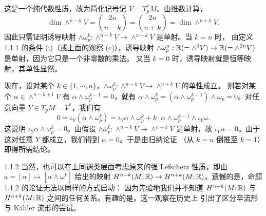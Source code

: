 \begin{wproof}
这是一个纯代数性质，故为简化记号记 $V=T_p^*M$。由维数计算，
\[
  \dim\wedge^{n-k}V=\binom{2n}{n-k}=\binom{2n}{n+k}=\dim\wedge^{n+k}V .
\]
因此只需证明诱导映射 $\wedge\omega_p^k:\wedge^{n-k}V\to\wedge^{n+k}V$ 是单射。当 $k=n$ 时，
由定义 1.1.1 的条件 (i)（或上面的观察 (c)），诱导映射
$\wedge\omega_p^n:\mathbb{R}(=\wedge^0V)\to\mathbb{R}(=\wedge^{2n}V)$ 是单射，因为它只是一个非零数的乘法。
又当 $k=0$ 时，诱导映射就是恒等映射，其单性显然。

现在，设对某个 $k\in\{1,\cdots,n\}$，$\wedge\omega_p^k:\wedge^{n-k}V\to\wedge^{n+k}V$ 的单性成立。
则若对某个 $\alpha\in\wedge^{n-k+1}V$ 有 $\alpha\wedge\omega_p^{k-1}=0$，就有
$\alpha\wedge\omega_p^k=(\alpha\wedge\omega_p^{k-1})\wedge\omega_p=0$。对任意向量
$Y\in T_pM=V^*$，我们有
\[
  0=\iota_Y(\alpha\wedge\omega_p^k)
  =\iota_Y\alpha\wedge\omega_p^k+k\cdot\alpha\wedge\omega_p^{k-1}\wedge\iota_Y\omega .
\]
这说明 $\iota_Y\alpha\wedge\omega_p^k=0$。由假设 $\wedge\omega_p^k:\wedge^{n-k}V\to\wedge^{n+k}V$
是单射，故 $\iota_Y\alpha=0$。由于这对任意 $Y$ 都成立，我们得到 $\alpha=0$。于是由归纳论证
（从 $k=n$ 倒推至 $k=1$）即得所需结论。
\end{wproof}

\begin{wrem}{1.1.2}
当然，也可以在上同调类层面考虑原来的强 Lefschetz 性质，即由 $a=[\alpha]\mapsto[\alpha\wedge\omega^k]$
给出的映射 $H^{n-k}(M;\mathbb{R})\to H^{n+k}(M;\mathbb{R})$。遗憾的是，命题 1.1.2 的论证无法以同样的方式启动：
因为先验地我们并不知道 $H^{n-k}(M;\mathbb{R})$ 与 $H^{n+k}(M;\mathbb{R})$ 之间的任何关系。有趣的是，这一观察在历史上
引出了区分辛流形与 Kähler 流形的尝试。
\end{wrem}
